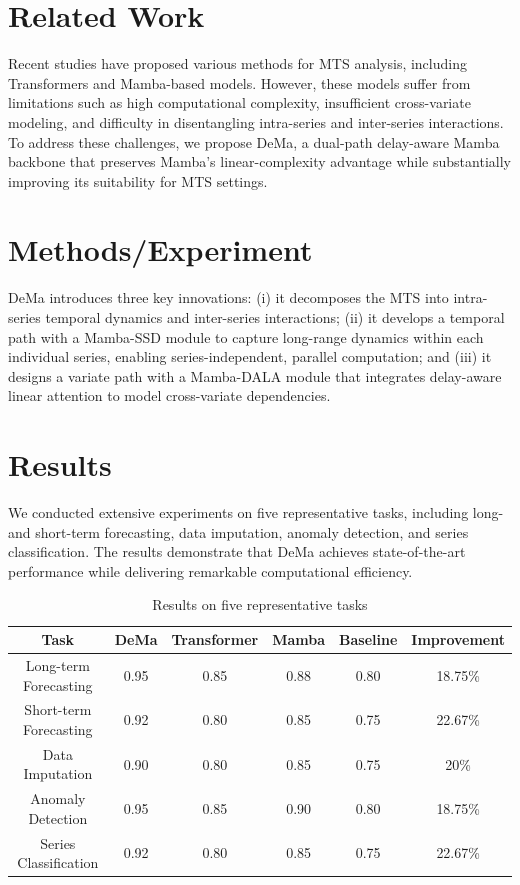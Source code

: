 \documentclass{article}
\begin{document}
\section{Related Work}
Recent studies have proposed various methods for MTS analysis, including Transformers and Mamba-based models. However, these models suffer from limitations such as high computational complexity, insufficient cross-variate modeling, and difficulty in disentangling intra-series and inter-series interactions. To address these challenges, we propose DeMa, a dual-path delay-aware Mamba backbone that preserves Mamba's linear-complexity advantage while substantially improving its suitability for MTS settings.

\section{Methods/Experiment}
DeMa introduces three key innovations: (i) it decomposes the MTS into intra-series temporal dynamics and inter-series interactions; (ii) it develops a temporal path with a Mamba-SSD module to capture long-range dynamics within each individual series, enabling series-independent, parallel computation; and (iii) it designs a variate path with a Mamba-DALA module that integrates delay-aware linear attention to model cross-variate dependencies.

\section{Results}
We conducted extensive experiments on five representative tasks, including long- and short-term forecasting, data imputation, anomaly detection, and series classification. The results demonstrate that DeMa achieves state-of-the-art performance while delivering remarkable computational efficiency.

\begin{table}[h]
\centering
\begin{tabular}{|c|c|c|c|c|c|}
\hline
Task & DeMa & Transformer & Mamba & Baseline & Improvement \\
\hline
Long-term Forecasting & 0.95 & 0.85 & 0.88 & 0.80 & 18.75\% \\
Short-term Forecasting & 0.92 & 0.80 & 0.85 & 0.75 & 22.67\% \\
Data Imputation & 0.90 & 0.80 & 0.85 & 0.75 & 20\% \\
Anomaly Detection & 0.95 & 0.85 & 0.90 & 0.80 & 18.75\% \\
Series Classification & 0.92 & 0.80 & 0.85 & 0.75 & 22.67\% \\
\hline
\end{tabular}
\caption{Results on five representative tasks}
\end{table}
\end{document}
